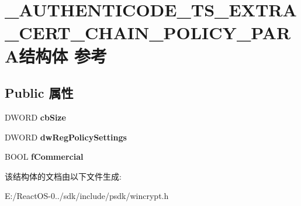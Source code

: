 \hypertarget{struct___a_u_t_h_e_n_t_i_c_o_d_e___t_s___e_x_t_r_a___c_e_r_t___c_h_a_i_n___p_o_l_i_c_y___p_a_r_a}{}\section{\+\_\+\+A\+U\+T\+H\+E\+N\+T\+I\+C\+O\+D\+E\+\_\+\+T\+S\+\_\+\+E\+X\+T\+R\+A\+\_\+\+C\+E\+R\+T\+\_\+\+C\+H\+A\+I\+N\+\_\+\+P\+O\+L\+I\+C\+Y\+\_\+\+P\+A\+R\+A结构体 参考}
\label{struct___a_u_t_h_e_n_t_i_c_o_d_e___t_s___e_x_t_r_a___c_e_r_t___c_h_a_i_n___p_o_l_i_c_y___p_a_r_a}
\subsection*{Public 属性}
\begin{DoxyCompactItemize}
\item 
\mbox{\label{struct___a_u_t_h_e_n_t_i_c_o_d_e___t_s___e_x_t_r_a___c_e_r_t___c_h_a_i_n___p_o_l_i_c_y___p_a_r_a_ac21dabace9db6aa7167b20bb817fea93}} 
D\+W\+O\+RD {\bfseries cb\+Size}
\item 
\mbox{\label{struct___a_u_t_h_e_n_t_i_c_o_d_e___t_s___e_x_t_r_a___c_e_r_t___c_h_a_i_n___p_o_l_i_c_y___p_a_r_a_abbfbecf9d5b2224df0fc21ba4b799766}} 
D\+W\+O\+RD {\bfseries dw\+Reg\+Policy\+Settings}
\item 
\mbox{\label{struct___a_u_t_h_e_n_t_i_c_o_d_e___t_s___e_x_t_r_a___c_e_r_t___c_h_a_i_n___p_o_l_i_c_y___p_a_r_a_aee5a54e8769ebeaf036f9cff230635b2}} 
B\+O\+OL {\bfseries f\+Commercial}
\end{DoxyCompactItemize}


该结构体的文档由以下文件生成\+:\begin{DoxyCompactItemize}
\item 
E\+:/\+React\+O\+S-\/0../sdk/include/psdk/wincrypt.\+h\end{DoxyCompactItemize}
